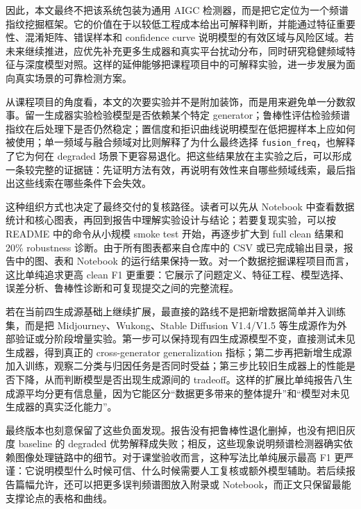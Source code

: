 \documentclass[sigconf,nonacm]{acmart}
\begin{document}
因此，本文最终不把该系统包装为通用 AIGC 检测器，而是把它定位为一个频谱指纹挖掘框架。它的价值在于以较低工程成本给出可解释判断，并能通过特征重要性、混淆矩阵、错误样本和 confidence curve 说明模型的有效区域与风险区域。若未来继续推进，应优先补充更多生成器和真实平台扰动分布，同时研究稳健频域特征与深度模型对照。这样的延伸能够把课程项目中的可解释实验，进一步发展为面向真实场景的可靠检测方案。

从课程项目的角度看，本文的次要实验并不是附加装饰，而是用来避免单一分数叙事。留一生成器实验检验模型是否依赖某个特定 generator；鲁棒性评估检验频谱指纹在后处理下是否仍然稳定；置信度和拒识曲线说明模型在低把握样本上应如何被使用；单一频域与融合频域对比则解释了为什么最终选择 \texttt{fusion\_freq}，也解释了它为何在 degraded 场景下更容易退化。把这些结果放在主实验之后，可以形成一条较完整的证据链：先证明方法有效，再说明有效性来自哪些频域线索，最后指出这些线索在哪些条件下会失效。

这种组织方式也决定了最终交付的复核路径。读者可以先从 Notebook 中查看数据统计和核心图表，再回到报告中理解实验设计与结论；若要复现实验，可以按 README 中的命令从小规模 smoke test 开始，再逐步扩大到 full clean 结果和 20\% robustness 诊断。由于所有图表都来自仓库中的 CSV 或已完成输出目录，报告中的图、表和 Notebook 的运行结果保持一致。对一个数据挖掘课程项目而言，这比单纯追求更高 clean F1 更重要：它展示了问题定义、特征工程、模型选择、误差分析、鲁棒性诊断和可复现提交之间的完整流程。

若在当前四生成源基础上继续扩展，最直接的路线不是把新增数据简单并入训练集，而是把 Midjourney、Wukong、Stable Diffusion V1.4/V1.5 等生成源作为外部验证或分阶段增量实验。第一步可以保持现有四生成源模型不变，直接测试未见生成器，得到真正的 cross-generator generalization 指标；第二步再把新增生成源加入训练，观察二分类与归因任务是否同时受益；第三步比较旧生成器上的性能是否下降，从而判断模型是否出现生成源间的 tradeoff。这样的扩展比单纯报告八生成源平均分更有信息量，因为它能区分“数据更多带来的整体提升”和“模型对未见生成器的真实泛化能力”。

最终版本也刻意保留了这些负面发现。报告没有把鲁棒性退化删掉，也没有把旧灰度 baseline 的 degraded 优势解释成失败；相反，这些现象说明频谱检测器确实依赖图像处理链路中的细节。对于课堂验收而言，这种写法比单纯展示最高 F1 更严谨：它说明模型什么时候可信、什么时候需要人工复核或额外模型辅助。若后续报告篇幅允许，还可以把更多误判频谱图放入附录或 Notebook，而正文只保留最能支撑论点的表格和曲线。

\balance


\end{document}
